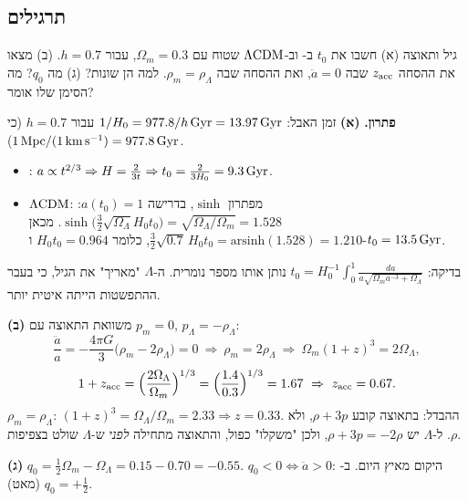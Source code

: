 \subsection*{תרגילים}
\begin{exercise}{גיל ותאוצה}
(א) חשבו את $t_0$ ב- וב-$\Lambda\mathrm{CDM}$ שטוח עם $\Omega_m=0.3$, עבור $h=0.7$.
(ב) מצאו את ההסחה $z_{\rm acc}$ שבה $\ddot a=0$, ואת ההסחה שבה $\rho_m=\rho_\Lambda$. למה הן שונות?
(ג) מה $q_0$? מה הסימן שלו אומר?
\end{exercise}
\begin{solbox}
\textbf{פתרון.}
\textbf{(א)} זמן האבל: $1/H_0=977.8/h\,\mathrm{Gyr}=13.97\,\mathrm{Gyr}$ עבור $h=0.7$ (כי $1\,\mathrm{Mpc}/(1\,\mathrm{km\,s^{-1}})=977.8\,\mathrm{Gyr}$).
\begin{itemize}
\item {}: $a\propto t^{2/3}\Rightarrow H=\frac{2}{3t}\Rightarrow t_0=\frac{2}{3H_0}=9.3\,\mathrm{Gyr}$.
\item $\Lambda\mathrm{CDM}$: מפתרון $\sinh$, בדרישה $a(t_0)=1$: $\sinh\!\big(\tfrac32\sqrt{\Omega_\Lambda}H_0t_0\big)=\sqrt{\Omega_\Lambda/\Omega_m}=1.528$. מכאן $\tfrac32\sqrt{0.7}\,H_0t_0=\mathrm{arsinh}(1.528)=1.210$, כלומר $H_0t_0=0.964$ ו-$t_0=13.5\,\mathrm{Gyr}$.
\end{itemize}
בדיקה: $t_0=H_0^{-1}\int_0^1\frac{da}{a\sqrt{\Omega_m a^{-3}+\Omega_\Lambda}}$ נותן אותו מספר נומרית. ה-$\Lambda$ "מאריך" את הגיל, כי בעבר ההתפשטות הייתה איטית יותר.

\textbf{(ב)} משוואת התאוצה עם $p_m=0$, $p_\Lambda=-\rho_\Lambda$:
\[
\frac{\ddot a}{a}=-\frac{4\pi G}{3}\big(\rho_m-2\rho_\Lambda\big)=0\ \Longrightarrow\ \rho_m=2\rho_\Lambda
\ \Longrightarrow\ \Omega_m(1+z)^3=2\Omega_\Lambda,
\]
\[
1+z_{\rm acc}=\Big(\frac{2\Omega_\Lambda}{\Omega_m}\Big)^{1/3}=\Big(\frac{1.4}{0.3}\Big)^{1/3}=1.67\ \Rightarrow\ z_{\rm acc}=0.67 .
\]
$\rho_m=\rho_\Lambda$: $(1+z)^3=\Omega_\Lambda/\Omega_m=2.33\Rightarrow z=0.33$. ההבדל: בתאוצה קובע $\rho+3p$, ולא $\rho$. ל-$\Lambda$ יש $\rho+3p=-2\rho$, ולכן "משקלו" כפול, והתאוצה מתחילה \emph{לפני} ש-$\Lambda$ שולט בצפיפות.

\textbf{(ג)} $q_0=\tfrac12\Omega_m-\Omega_\Lambda=0.15-0.70=-0.55$. $q_0<0\iff\ddot a>0$: היקום מאיץ היום. ב- $q_0=+\tfrac12$ (מאט).
\end{solbox}


